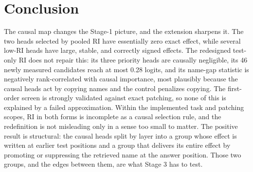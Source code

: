 \documentclass[11pt,a4paper]{article}
\begin{document}
\section{Conclusion}
The causal map changes the Stage-1 picture, and the extension sharpens it. The
two heads selected by pooled RI have essentially zero exact effect, while several
low-RI heads have large, stable, and correctly signed effects. The redesigned
test-only RI does not repair this: its three priority heads are causally
negligible, its 46 newly measured candidates reach at most 0.28 logits, and its
name-gap statistic is negatively rank-correlated with causal importance, most
plausibly because the causal heads act by copying names and the control
penalizes copying. The first-order screen is strongly validated against exact
patching, so none of this is explained by a failed approximation. Within the
implemented task and patching scopes, RI in both forms is incomplete as a causal
selection rule, and the redefinition is not misleading only in a sense too small
to matter. The positive result is structural: the causal heads split by layer
into a group whose effect is written at earlier test positions and a group that
delivers its entire effect by promoting or suppressing the retrieved name at the
answer position. Those two groups, and the edges between them, are what Stage 3
has to test.
\end{document}
